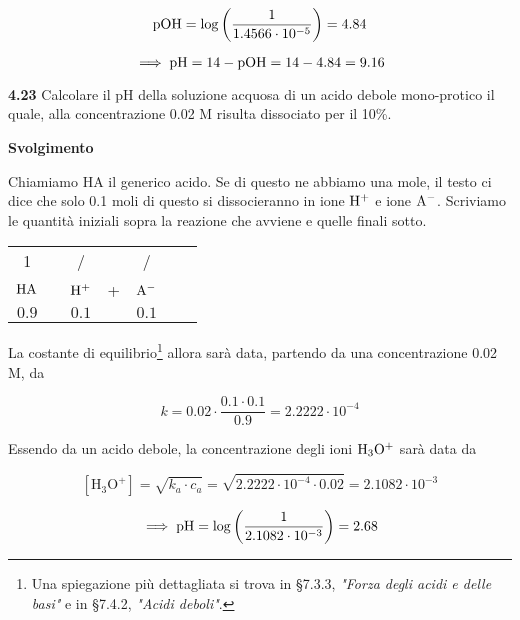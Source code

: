 $$\rm pOH=\log \left( \frac{1}{1.4566 \cdot 10^{-5}} \right)=4.84$$

$$\implies \rm pH=14-pOH=14-4.84=9.16$$

\vspace{0.2cm}\textbf{4.23} Calcolare il pH della soluzione acquosa di un acido debole mono-protico il quale, alla concentrazione 0.02 M risulta dissociato per il 10\%.

\vspace{0.2cm}\large\textbf{Svolgimento}\normalsize

\vspace{0.2cm} Chiamiamo HA il generico acido. Se di questo ne abbiamo una mole, il testo ci dice che solo 0.1 moli di questo si dissocieranno in ione $\rm H^+$ e ione $\rm A^-$. Scriviamo le quantità iniziali sopra la reazione che avviene e quelle finali sotto.

\begin{center}
    \begin{tabular}{ccccccc}
        1 & & / & & /\\
        $\rm HA$ & \ce{<-->} & $\rm H^+$ & + & $\rm A^-$\\
        $0.9$ & & $0.1$ & & $0.1$\\
    \end{tabular}
\end{center}

La costante di equilibrio\footnote{Una spiegazione più dettagliata si trova in §7.3.3, \textit{"Forza degli acidi e delle basi"} e in §7.4.2, \textit{"Acidi deboli"}.} allora sarà data, partendo da una concentrazione 0.02 M, da

$$k=0.02 \cdot \frac{0.1 \cdot 0.1}{0.9}=2.2222 \cdot 10^{-4}$$

Essendo da un acido debole, la concentrazione degli ioni $\rm H_3O^+$ sarà data da

$$[\text{H}_3\text{O}^+] = \sqrt{k_a \cdot c_a}
=\sqrt{2.2222 \cdot 10^{-4} \cdot 0.02}=2.1082 \cdot 10^{-3}$$

$$\implies \rm pH=\log{\left(\frac{1}{2.1082 \cdot 10^{-3}}\right)}=2.68$$